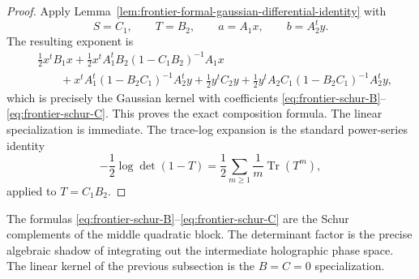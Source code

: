 \begin{proof}
Apply Lemma~\ref{lem:frontier-formal-gaussian-differential-identity} with
\[
S=C_1,
\qquad
T=B_2,
\qquad
a=A_1x,
\qquad
b=A_2^t y.
\]
The resulting exponent is
\begin{align*}
&\frac12 x^t B_1x
+ \frac12 x^t A_1^t B_2(1-C_1B_2)^{-1}A_1x\\
&\qquad
+ x^t A_1^t(1-B_2C_1)^{-1}A_2^t y
+ \frac12 y^t C_2 y
+ \frac12 y^t A_2 C_1(1-B_2C_1)^{-1}A_2^t y,
\end{align*}
which is precisely the Gaussian kernel with coefficients
\eqref{eq:frontier-schur-B}--\eqref{eq:frontier-schur-C}.
This proves the exact composition formula.
The linear specialization is immediate.
The trace-log expansion is the standard power-series identity
\[
-\frac12\log\det(1-T)
=
\frac12\sum_{m\ge 1}\frac{1}{m}\operatorname{Tr}(T^m),
\]
applied to $T=C_1B_2$.
\end{proof}

\begin{remark}
\label{rem:frontier-gaussian-composition-interpretation}
The formulas
\eqref{eq:frontier-schur-B}--\eqref{eq:frontier-schur-C} are the Schur
complements of the middle quadratic block. The determinant factor is the
precise algebraic shadow of integrating out the intermediate holographic phase
space. The linear kernel of the previous subsection is the
$B=C=0$ specialization.
\end{remark}

